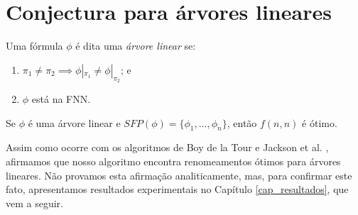\section{Conjectura para árvores lineares}

\indent

\begin{definition}
	Uma fórmula $\phi$ é dita uma \emph{árvore linear} se:
	\begin{enumerate}
		\item $\pi_1 \neq \pi_2 \implies \phi|_{\pi_1} \neq \phi|_{\pi_2}$; e
		\item $\phi$ está na FNN.
	\end{enumerate}
\end{definition}

\begin{conjecture}
	Se $\phi$ é uma árvore linear e $SFP(\phi) = \{\phi_1,...,\phi_n \}$, então $f(n,n)$ é ótimo.
\end{conjecture}

Assim como ocorre com os algoritmos de Boy de la Tour \cite{de1992optimality} e Jackson et al. \cite{jackson2004clause}, afirmamos que nosso algoritmo encontra renomeamentos ótimos para árvores lineares. Não provamos esta afirmação analiticamente, mas, para confirmar este fato, apresentamos resultados experimentais no Capítulo \ref{cap_resultados}, que vem a seguir.
